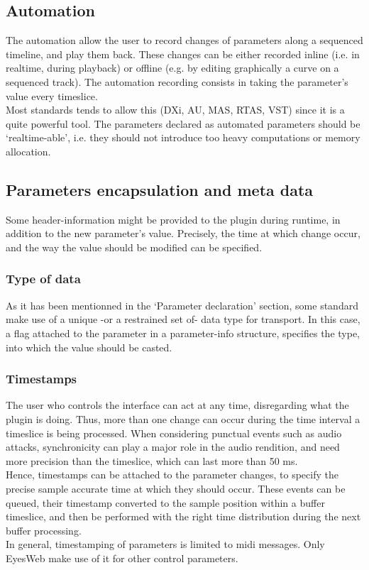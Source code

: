 \subsection{Automation}
\label{automation}
\noindent The automation allow the user to record changes of parameters along a sequenced timeline, and play them back. These changes can be either recorded inline (i.e. in realtime, during playback) or offline (e.g. by editing graphically a curve on a sequenced track). The automation recording consists in taking the parameter's value every timeslice.\\
\noindent Most standards tends to allow this (DXi, AU, MAS, RTAS, VST) since it is a quite powerful tool. The parameters declared as automated parameters should be `realtime-able', i.e. they should not introduce too heavy computations or memory allocation. 

\subsection{Parameters encapsulation and meta data}

\noindent Some header-information might be provided to the plugin during runtime, in addition to the new parameter's value. Precisely, the time at which change occur, and the way the value should be modified can be specified.

\subsubsection{Type of data}
\noindent As it has been mentionned in the `Parameter declaration' section, some standard make use of a unique -or a restrained set of- data type for transport. In this case, a flag attached to the parameter in a parameter-info structure, specifies the type, into which the value should be casted.

\subsubsection{Timestamps}
\noindent The user who controls the interface can act at any time, disregarding what the plugin is doing. Thus, more than one change can occur during the time interval a timeslice is being processed. When considering punctual events such as audio attacks, synchronicity can play a major role in the audio rendition, and need more precision than the timeslice, which can last more than 50 ms.\\
\noindent Hence, timestamps can be attached to the parameter changes, to specify the precise sample accurate time at which they should occur. These events can be queued, their timestamp converted to the sample position within a buffer timeslice, and then be performed with the right time distribution during the next buffer processing.\\
\noindent In general, timestamping of parameters is limited to midi messages. Only EyesWeb make use of it for other control parameters.

